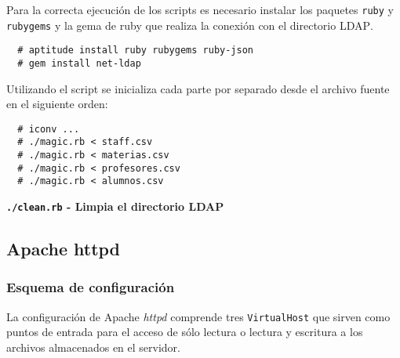 Para la correcta ejecuci\'{o}n de los scripts es necesario instalar los paquetes \texttt{ruby} y \texttt{rubygems} y la gema de ruby que realiza la conexi\'{o}n con el directorio \textsc{LDAP}.

{
\scriptsize
\linespread{1}
\begin{verbatim}
  # aptitude install ruby rubygems ruby-json
  # gem install net-ldap
\end{verbatim}
}

Utilizando el script se inicializa cada parte por separado desde el archivo fuente en el siguiente orden:

{
\scriptsize
\linespread{1}
\begin{verbatim}
  # iconv ...
  # ./magic.rb < staff.csv
  # ./magic.rb < materias.csv
  # ./magic.rb < profesores.csv
  # ./magic.rb < alumnos.csv
\end{verbatim}
}

\textbf{\texttt{./clean.rb} - Limpia el directorio LDAP}

      \subsection {Apache httpd}

        \subsubsection {Esquema de configuraci\'{o}n}

La configuraci\'{o}n de Apache \textit{httpd} comprende tres \texttt{VirtualHost} que sirven como puntos de entrada para el acceso de s\'{o}lo lectura o lectura y escritura a los archivos almacenados en el servidor.

{
\begin{table}[H]
\caption{VirtualHost configurados en Apache HTTPD}{}
\label{tab:virtualhost}
\noindent{} %
\end{table}
}

